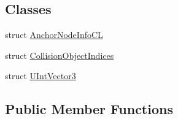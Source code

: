 \subsection*{Classes}
\begin{DoxyCompactItemize}
\item 
struct \hyperlink{structbtOpenCLSoftBodySolver_1_1AnchorNodeInfoCL}{Anchor\+Node\+Info\+CL}
\item 
struct \hyperlink{structbtOpenCLSoftBodySolver_1_1CollisionObjectIndices}{Collision\+Object\+Indices}
\item 
struct \hyperlink{structbtOpenCLSoftBodySolver_1_1UIntVector3}{U\+Int\+Vector3}
\end{DoxyCompactItemize}
\subsection*{Public Member Functions}

